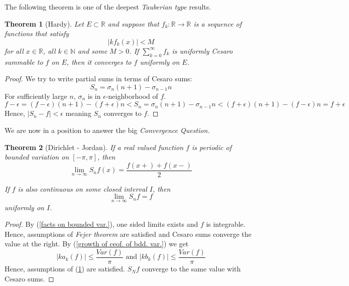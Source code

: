\documentclass[12pt]{amsart}
\newtheorem{theorem}{Theorem}[section]
\theoremstyle{definition}
\newcommand{\NN}{{\mathbb N}} %
\newcommand{\RR}{{\mathbb R}} %
\begin{document}
The following theorem is one of the deepest \emph{Tauberian type} results.


\begin{theorem}[Hardy]\label{Hardy}
    Let $E \subset \RR$ and suppose that $f_k: \RR \to \RR$ is a sequence of functions that satisfy
    \[
    |kf_k(x)| < M
    \]
    for all $x \in \RR$, all $k \in \NN$ and some $M > 0$. If $\sum_{k=0}^{\infty}f_k$ is uniformly Cesaro summable to $f$ on $E$,
    then it converges to $f$ uniformly on $E$.
\end{theorem}


\begin{proof}




    We try to write partial sums in terms of Cesaro sums:
    \[
    S_n = \sigma_n (n+1) - \sigma_{n-1} n
    \]
    For sufficiently large $n$, $\sigma_n$ is in $\epsilon$-neighborhood of $f$.
    \[
  f - \epsilon = (f-\epsilon)(n+1) -  (f+\epsilon)n < S_n = \sigma_n (n+1) - \sigma_{n-1} n < (f+\epsilon)(n+1) -  (f-\epsilon)n =  f + \epsilon
    \]
    Hence, $|S_n - f| < \epsilon$ meaning $S_n$ converges to $f$.
\end{proof}


We are now in a position to answer the big \emph{Convergence Question.}

\begin{theorem}[Dirichlet - Jordan]\label{Dirichlet - Jordan}
    If a real valued function $f$ is periodic of bounded variation on $[-\pi,\pi]$, then
    \[
    \lim_{n \to \infty}S_nf(x) = \frac{f(x+) + f(x-)}{2}
    \]

    If $f$ is also continuous on some closed interval $I$, then
    \[
    \lim_{n \to \infty}S_nf = f
    \]
    uniformly on $I$.
\end{theorem}


\begin{proof}
    By (\ref{facts on bounded var.}), one sided limits exists and $f$ is integrable. Hence, assumptions of \emph{Fejer theorem} are satisfied and Cesaro sums converge the value at the right. By (\ref{growth of ceof. of bdd. var.}) we get
    \[
    |ka_k(f)|\leq \frac{Var(f)}{\pi}  \text{ and }  |kb_k(f)| \leq \frac{Var(f)}{\pi}
    \]
    Hence, assumptions of (\ref{Hardy}) are satisfied. $S_Nf$ converge to the same value with Cesaro sums.
\end{proof}
\end{document}
